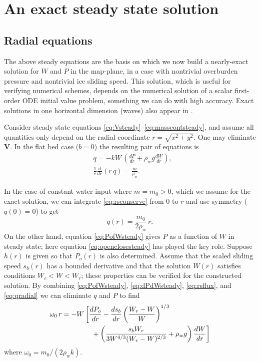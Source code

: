 \documentclass[gmd]{copernicus}   %
\newcommand\bV{\mathbf{V}}
\begin{document}
\section{An exact steady state solution}  \label{sec:exactsolution}

\subsection{Radial equations}  The above steady equations are the basis on which we now build a nearly-exact solution for $W$ and $P$ in the map-plane, in a case with nontrivial overburden pressure and nontrivial ice sliding speed.  This solution, which is useful for verifying numerical schemes, depends on the numerical solution of a scalar first-order ODE initial value problem, something we can do with high accuracy.  Exact solutions in one horizontal dimension (waves) also appear in \cite{Schoofetal2012}.

Consider steady state equations \eqref{eq:Vsteady}--\eqref{eq:masscontsteady}, and assume all quantities only depend on the radial coordinate $r = \sqrt{x^2+y^2}$.  One may eliminate $\bV$.  In the flat bed case ($b=0$) the resulting pair of equations is
\begin{align}
&q = - k W\, \left(\frac{dP}{dr} + \rho_w g \frac{dW}{dr}\right), \label{eq:rsflux} \\
&\frac{1}{r}\frac{d}{dr}\left(r\,q\right) = \frac{m}{\rho_w}. \label{eq:rsconserve}
\end{align}

In the case of constant water input where $m = m_0 > 0$, which we assume for the exact solution, we can integrate \eqref{eq:rsconserve} from $0$ to $r$ and use symmetry ($q(0)=0$) to get
\begin{equation}
q(r) = \frac{m_0}{2\rho_w} \, r. \label{eq:qradial}
\end{equation}
On the other hand, equation \eqref{eq:PofWsteady} gives $P$ as a function of $W$ in steady state; here equation \eqref{eq:openclosesteady} has played the key role.  Suppose $h(r)$ is given so that $P_o(r)$ is also determined.  Assume that the scaled sliding speed $s_b(r)$ has a bounded derivative and that the solution $W(r)$ satisfies conditions $W_c < W < W_r$; these properties can be verified for the constructed solution.  By combining \eqref{eq:PofWsteady}, \eqref{eq:dPdWsteady}, \eqref{eq:rsflux}, and \eqref{eq:qradial} we can eliminate $q$ and $P$ to find
\begin{align}
&\omega_0\, r = - W\, \bigg[\frac{dP_o}{dr} - \frac{ds_b}{dr} \left(\frac{W_r - W}{W}\right)^{1/3}  \label{eq:ODEfirst} \\
&\qquad \qquad \qquad + \left(\frac{s_b W_r}{3 W^{4/3} (W_r - W)^{2/3}} + \rho_w g\right) \frac{dW}{dr}\bigg] \notag
\end{align}
where $\omega_0 = m_0 / (2 \rho_w k)$.
\end{document}

